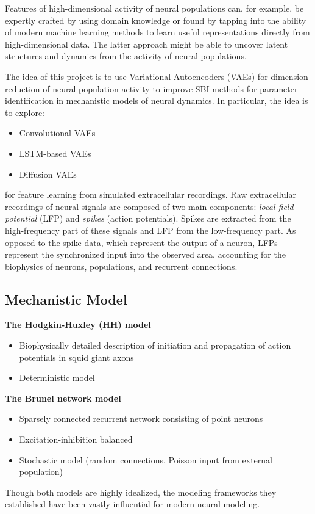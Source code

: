 Features of high-dimensional activity of neural populations can, for example, be expertly crafted by using domain knowledge or found by tapping into the ability of modern machine learning methods to learn useful representations directly from high-dimensional data. The latter approach might be able to uncover latent structures and dynamics from the activity of neural populations.

The idea of this project is to use Variational Autoencoders (VAEs) for dimension reduction of neural population activity to improve SBI methods for parameter identification in mechanistic models of neural dynamics. In particular, the idea is to explore:

\begin{itemize}
    \item Convolutional VAEs
    \item LSTM-based VAEs
    \item Diffusion VAEs
\end{itemize}


for feature learning from simulated extracellular recordings. Raw extracellular recordings of neural signals are composed of two main components: \textit{local field potential} (LFP) and \textit{spikes} (action potentials). Spikes are extracted from the high-frequency part of these signals and LFP from the low-frequency part. As opposed to the spike data, which represent the output of a neuron, LFPs represent the synchronized input into the observed area, accounting for the biophysics of neurons, populations, and recurrent connections.


\subsection{Mechanistic Model}

\textbf{The Hodgkin-Huxley (HH) model}

\begin{itemize}
    \item Biophysically detailed description of initiation and propagation of action potentials in squid giant axons
    \item Deterministic model
\end{itemize}

\textbf{The Brunel network model}

\begin{itemize}
    \item Sparsely connected recurrent network consisting of point neurons
    \item Excitation-inhibition balanced
    \item Stochastic model (random connections, Poisson input from external population)
\end{itemize}
    
Though both models are highly idealized, the modeling frameworks they established have been vastly influential for modern neural modeling.